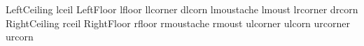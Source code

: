  LeftCeiling  lceil
 LeftFloor    lfloor
 llcorner     dlcorn
 lmoustache   lmoust
 lrcorner     drcorn
 RightCeiling rceil
 RightFloor   rfloor
 rmoustache   rmoust
 ulcorner     ulcorn
 urcorner     urcorn
